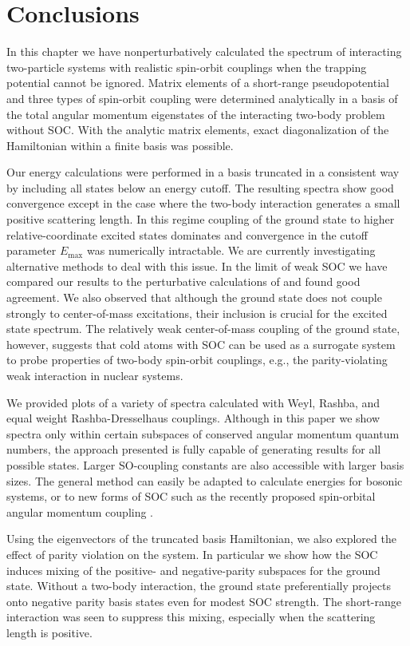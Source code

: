 \section{Conclusions}

In this chapter we have nonperturbatively calculated the spectrum of interacting two-particle systems with realistic spin-orbit couplings when the trapping potential cannot be ignored.  Matrix elements of a short-range pseudopotential and three types of spin-orbit coupling were determined analytically in a basis of the total angular momentum eigenstates of the interacting two-body problem without SOC. With the analytic matrix elements, exact diagonalization of the Hamiltonian within a finite basis was possible.

Our energy calculations were performed in a basis truncated in a consistent way by including all states below an energy cutoff. The resulting spectra show good convergence except in the case where the two-body interaction generates a small positive scattering length. In this regime coupling of the ground state to higher relative-coordinate excited states dominates and convergence in the cutoff parameter $E_{\text{max}}$ was numerically intractable. We are currently investigating alternative methods to deal with this issue. In the limit of weak SOC we have compared our results to the perturbative calculations of \cite{PhysRevA.89.033606} and found good agreement. We also observed that although the ground state does not couple strongly to center-of-mass excitations, their inclusion is crucial for the excited state spectrum.  The relatively weak center-of-mass coupling of the ground state, however, suggests that cold atoms with SOC can be used as a surrogate system to probe properties of two-body spin-orbit couplings, e.g., the parity-violating weak interaction in nuclear systems. 

We provided plots of a variety of spectra calculated with Weyl, Rashba, and equal weight Rashba-Dresselhaus couplings.  Although in this paper we show spectra only within certain subspaces of conserved angular momentum quantum numbers, the approach presented is fully capable of generating results for all possible states. Larger SO-coupling constants are also accessible with larger basis sizes. The general method can easily be adapted to calculate energies for bosonic systems, or to new forms of SOC such as the recently proposed spin-orbital angular momentum coupling \cite{2014arXiv1411.1737S}.  

Using the eigenvectors of the truncated basis Hamiltonian, we also explored the effect of parity violation on the system. In particular we show how the SOC induces mixing of the positive- and negative-parity subspaces for the ground state. Without a two-body interaction, the ground state preferentially projects onto negative parity basis states even for modest SOC strength. The short-range interaction was seen to suppress this mixing, especially when the scattering length is positive.

